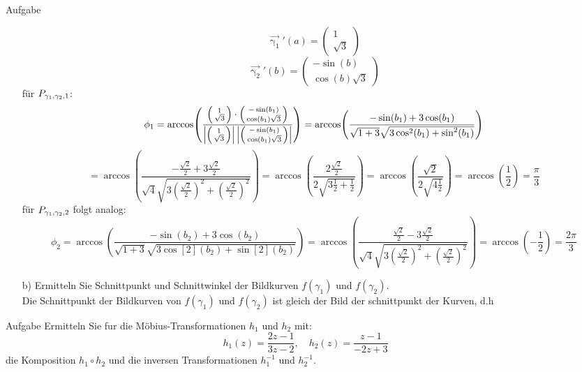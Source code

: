 \documentclass{scrartcl}
\begin{document}
\begin{section}{Aufgabe}
\begin{itemize}
\[\vec{\upgamma_1}'(a)=\begin{pmatrix}1\\\sqrt{3}\end{pmatrix}\]
\[\vec{\upgamma_2}'(b)=\begin{pmatrix}-\sin(b)\\\cos(b)\sqrt{3}\end{pmatrix}\]
für $P_{\gamma_1,\gamma_2,1}$:
\[\phi_1=\arccos(\frac{\begin{psmallmatrix}1\\\sqrt{3}\end{psmallmatrix}\cdot \begin{psmallmatrix}-\sin(b_1)\\\cos(b_1)\sqrt{3}\end{psmallmatrix}}{\left|\begin{psmallmatrix}1\\\sqrt{3}\end{psmallmatrix}\right|\left|\begin{psmallmatrix}-\sin(b_1)\\\cos(b_1)\sqrt{3}\end{psmallmatrix}\right|})
=\arccos(\frac{-\sin(b_1)+3\cos(b_1)}{\sqrt{1+3} \sqrt{3 \cos[2](b_1)+\sin[2](b_1)}})\]
\[=\arccos(\frac{-\frac{\sqrt{2}}{2}+3\frac{\sqrt{2}}{2}}{\sqrt{4} \sqrt{3 (\frac{\sqrt{2}}{2})^2+(\frac{\sqrt{2}}{2})^2}})=
\arccos(\frac{2\frac{\sqrt{2}}{2}}{2 \sqrt{3 \frac{1}{2}+\frac{1}{2}}})
=\arccos(\frac{\sqrt{2}}{2 \sqrt{4\frac{1}{2}}})
=\arccos(\frac{1}{2})=\frac{\pi}{3}\]
für $P_{\gamma_1,\gamma_2,2}$ folgt analog:
\[\phi_2=\arccos(\frac{-\sin(b_2)+3\cos(b_2)}{\sqrt{1+3} \sqrt{3 \cos[2](b_2)+\sin[2](b_2)}})
=\arccos(\frac{\frac{\sqrt{2}}{2}-3\frac{\sqrt{2}}{2}}{\sqrt{4} \sqrt{3 (\frac{\sqrt{2}}{2})^2+(\frac{\sqrt{2}}{2})^2}})
=\arccos(-\frac{1}{2})=\frac{2\pi}{3}\]

\item[b)]
Ermitteln Sie Schnittpunkt und Schnittwinkel der Bildkurven $f(\gamma_1)$ und $f(\gamma_2)$.\\
Die Schnittpunkt der Bildkurven von $f(\gamma_1)$ und $f(\gamma_2)$ ist gleich der Bild der schnittpunkt der Kurven, d.h

\end{itemize}


\end{section}
\begin{section}{Aufgabe}%
Ermitteln Sie fur die Möbius-Transformationen $h_1$ und $h_2$ mit:
\[h_1(z)=\frac{2z-1}{3z-2},\quad h_2(z)=\frac{z-1}{-2z+3}\]
die Komposition $h_1 \circ h_2$ und die inversen Transformationen $h_1^{-1}$ und $h_2^{-1}$.

\end{section}
\end{document}
